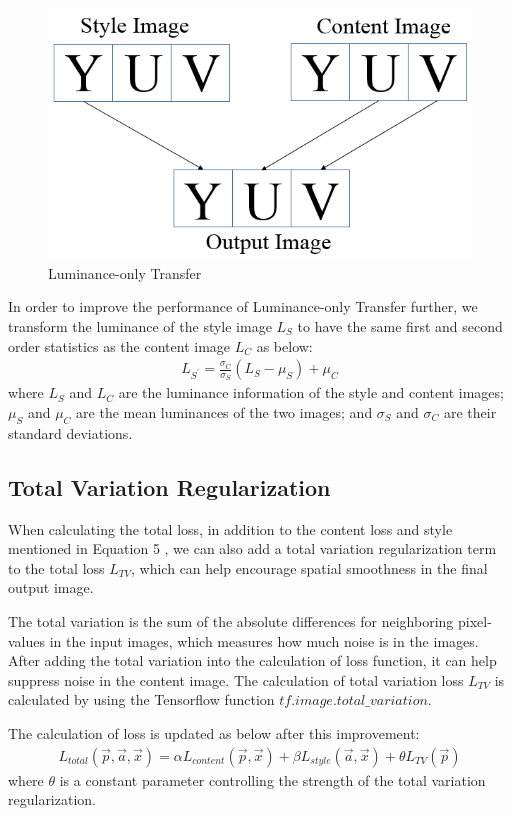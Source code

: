 \documentclass[runningheads]{llncs}
\begin{document}
\begin{figure}[h!]
    \centering
    \includegraphics[scale=.4]{YUV.PNG}
    \caption{Luminance-only Transfer}
    \label{fig:yuv}
\end{figure}

In order to improve the performance of Luminance-only Transfer further, we transform the luminance of the style image $L_S$  to have the same first and second order statistics as the content image $L_C$ as below: 
\begin{align}
    L_{S^{'}}=\frac{\sigma_{C}}{\sigma_{S}}(L_{S}-\mu_{S})+\mu_{C}
\end{align}
where $L_S$ and $L_C$ are the luminance information of the style and content images; $\mu_S$ and $\mu_C$ are the mean luminances
of the two images; and $\sigma_S$ and $\sigma_C$ are their standard deviations.
\subsection{Total Variation Regularization} When calculating the total loss, in addition to the content loss and style mentioned in Equation 5 , we can also add a  total variation regularization term to the total loss $L_{TV}$\cite{JohsonJustin2016PLfR}, which can help encourage spatial smoothness in the final output image. 

The total variation is the sum of the absolute differences for neighboring pixel-values in the input images, which measures how much noise is in the images. After adding the total variation into the calculation of loss function, it can help suppress noise in the content image. The calculation of total variation loss $L_{TV}$ is calculated by using the Tensorflow function $tf.image.total\_variation$.

The calculation of loss is updated as below after this improvement:
\begin{align}
    L_{total}(\vec{p},\vec{a},\vec{x})=\alpha L_{content}(\vec{p},\vec{x})+\beta L_{style}(\vec{a},\vec{x})+\theta L_{TV}(\vec{p})
\end{align}
where $\theta$ is a constant parameter controlling the strength of the total variation regularization.
\end{document}
